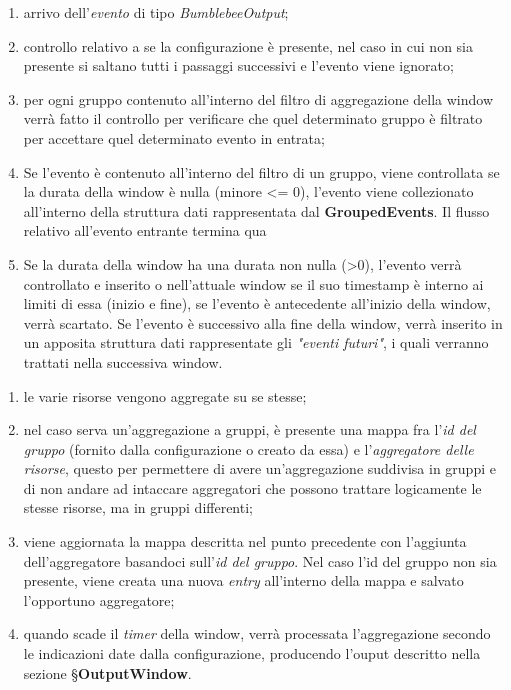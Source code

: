 \begin{enumerate}
	\item{arrivo dell'\textit{evento} di tipo \textit{BumblebeeOutput};}
	\item{controllo relativo a se la configurazione è presente, nel caso in cui non sia presente si saltano tutti i passaggi successivi e l'evento viene ignorato;}
	\item{per ogni gruppo contenuto all'interno del filtro di aggregazione della window verrà fatto il controllo per verificare che quel determinato gruppo è filtrato per accettare quel determinato evento in entrata;}
\item{Se l'evento è contenuto all'interno del filtro di un gruppo, viene controllata se la durata della window è nulla (minore <= 0), l'evento viene collezionato all'interno della struttura dati rappresentata dal \textbf{GroupedEvents}. Il flusso relativo all'evento entrante termina qua}
\item{Se la durata della window ha una durata non nulla (>0), l'evento verrà controllato e inserito o nell'attuale window se il suo \gls{timestamp} è interno ai limiti di essa (inizio e fine), se l'evento è antecedente all'inizio della window, verrà scartato. Se l'evento è successivo alla fine della window, verrà inserito in un apposita struttura dati rappresentate gli \textit{"eventi futuri"}, i quali verranno trattati nella successiva window.}
\end{enumerate}

\begin{enumerate}
	
	\item{le varie risorse vengono aggregate su se stesse;}
	\item{nel caso serva un'aggregazione a gruppi, è presente una mappa fra l'\textit{id del gruppo} (fornito dalla configurazione o creato da essa) e l'\textit{aggregatore delle risorse}, questo per permettere di avere un'aggregazione suddivisa in gruppi e di non andare ad intaccare aggregatori che possono trattare logicamente le stesse risorse, ma in gruppi differenti;}
	\item{viene aggiornata la mappa descritta nel punto precedente con l'aggiunta dell'aggregatore basandoci sull'\textit{id del gruppo}. Nel caso l'id del gruppo non sia presente, viene creata una nuova \textit{entry} all'interno della mappa e salvato l'opportuno aggregatore;}
	\item{quando scade il \textit{timer} della window, verrà processata l'aggregazione secondo le indicazioni date dalla configurazione, producendo l'ouput descritto nella sezione \S\textbf{OutputWindow}}.
\end{enumerate}

